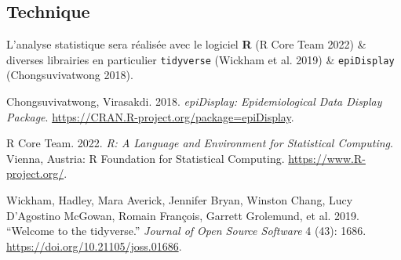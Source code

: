 \documentclass[
]{article}
\newlength{\cslhangindent}
\newlength{\cslentryspacingunit} %
\newenvironment{CSLReferences}[2] %
 {%
  \setlength{\parindent}{0pt}
  \ifodd #1
  \let\oldpar\par
  \def\par{\hangindent=\cslhangindent\oldpar}
  \fi
  \setlength{\parskip}{#2\cslentryspacingunit}
 }%
 {}
\begin{document}
\hypertarget{technique}{%
\subsection{Technique}\label{technique}}

L'analyse statistique sera réalisée avec le logiciel \textbf{R} (R Core
Team 2022) \& diverses librairies en particulier \texttt{tidyverse}
(Wickham et al. 2019) \& \texttt{epiDisplay} (Chongsuvivatwong 2018).

\hypertarget{refs}{}
\begin{CSLReferences}{1}{0}
\leavevmode{}%
Chongsuvivatwong, Virasakdi. 2018. \emph{epiDisplay: Epidemiological
Data Display Package}.
\url{https://CRAN.R-project.org/package=epiDisplay}.

\leavevmode{}%
R Core Team. 2022. \emph{R: A Language and Environment for Statistical
Computing}. Vienna, Austria: R Foundation for Statistical Computing.
\url{https://www.R-project.org/}.

\leavevmode{}%
Wickham, Hadley, Mara Averick, Jennifer Bryan, Winston Chang, Lucy
D'Agostino McGowan, Romain François, Garrett Grolemund, et al. 2019.
{``Welcome to the {tidyverse}.''} \emph{Journal of Open Source Software}
4 (43): 1686. \url{https://doi.org/10.21105/joss.01686}.

\end{CSLReferences}
\end{document}
